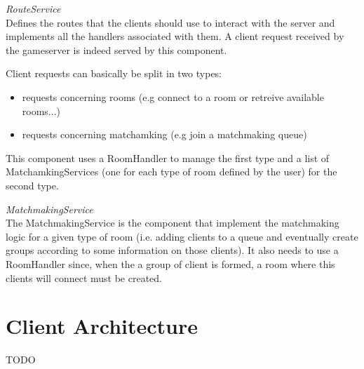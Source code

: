 \bigskip
\textit{RouteService}
\\
Defines the routes that the clients should use to interact with the server and implements all the handlers associated with them. A client request received by the gameserver is indeed served by this component. 

Client requests can basically be split in two types:
\begin{itemize}
	\item requests concerning rooms (e.g connect to a room or retreive available rooms...)
	\item requests concerning matchamking (e.g join a matchmaking queue)
\end{itemize}
This component uses a RoomHandler to manage the first type and a list of MatchamkingServices (one for each type of room defined by the user) for the second type. 

\bigskip
\textit{MatchmakingService}
\\
The MatchmakingService is the component that implement the matchmaking logic for a given type of room (i.e. adding clients to a queue and eventually create groups according to some information on those clients). It also needs to use a RoomHandler since, when the a group of client is formed, a room where this clients will connect must be created.



\section{Client Architecture}

TODO

